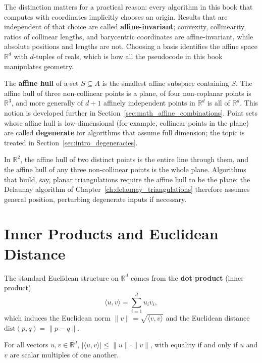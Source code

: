 The distinction matters for a practical reason: every algorithm in this book
that computes with coordinates implicitly chooses an origin. Results that are
independent of that choice are called \textbf{affine-invariant}; convexity,
collinearity, ratios of collinear lengths, and barycentric coordinates are
affine-invariant, while absolute positions and lengths are not. Choosing a
basis identifies the affine space $\mathbb{R}^d$ with $d$-tuples of reals,
which is how all the pseudocode in this book manipulates geometry.

The \textbf{affine hull} of a set $S\subseteq A$ is the smallest affine
subspace containing $S$. The affine hull of three non-collinear points is a
plane, of four non-coplanar points is $\mathbb{R}^3$, and more generally of
$d+1$ affinely independent points in $\mathbb{R}^d$ is all of
$\mathbb{R}^d$. This notion is developed further in
Section~\ref{sec:math_affine_combinations}. Point sets whose affine hull is
low-dimensional (for example, collinear points in the plane) are called
\textbf{degenerate} for algorithms that assume full dimension; the topic is
treated in Section~\ref{sec:intro_degeneracies}.

\begin{example}
  In $\mathbb{R}^2$, the affine hull of two distinct points is the entire
  line through them, and the affine hull of any three non-collinear points is
  the whole plane. Algorithms that build, say, planar triangulations require
  the affine hull to be the plane; the Delaunay algorithm of
  Chapter~\ref{ch:delaunay_triangulations} therefore assumes general
  position, perturbing degenerate inputs if necessary.
\end{example}


\section{Inner Products and Euclidean Distance}
\label{sec:math_inner_products}

The standard Euclidean structure on $\mathbb{R}^d$ comes from the
\textbf{dot product} (inner product)
\[
  \langle u, v \rangle = \sum_{i=1}^d u_i v_i,
\]
which induces the Euclidean norm $\|v\| = \sqrt{\langle v,v\rangle}$ and the
Euclidean distance $\mathrm{dist}(p,q) = \|p-q\|$.

\begin{theorem}\label{thm:math_cauchy_schwarz}
  For all vectors $u,v \in \mathbb{R}^d$, $|\langle u, v\rangle| \le \|u\|
  \cdot \|v\|$, with equality if and only if $u$ and $v$ are scalar multiples
  of one another.
\end{theorem}

